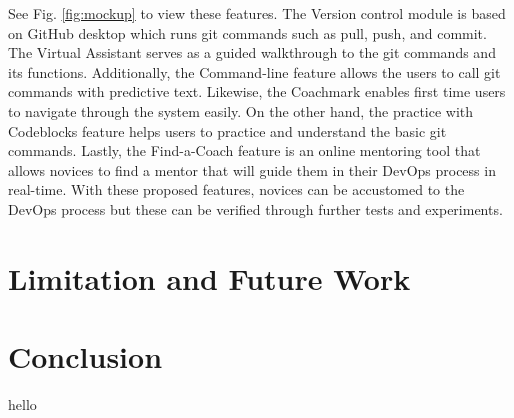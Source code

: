 \documentclass{sigchi}
\begin{document}
See Fig. \ref{fig:mockup} to view these features. The Version control module is based on GitHub desktop which runs git commands such as pull, push, and commit. The Virtual Assistant serves as a guided walkthrough to the git commands and its functions. Additionally, the Command-line feature allows the users to call git commands with predictive text. Likewise, the Coachmark enables first time users to navigate through the system easily. On the other hand, the practice with Codeblocks feature helps users to practice and understand the basic git commands. Lastly, the Find-a-Coach feature is an online mentoring tool that allows novices to find a mentor that will guide them in their DevOps process in real-time. With these proposed features, novices can be accustomed to the DevOps process but these can be verified through further tests and experiments. 







\section{Limitation and Future Work}



\section{Conclusion}
hello





%



\balance{}



\end{document}
